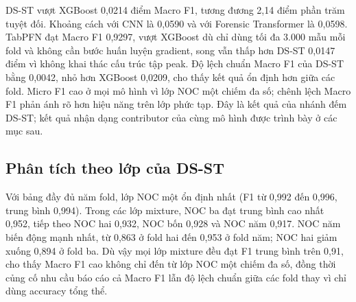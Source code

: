 \documentclass[12pt,a4paper]{article}
\begin{document}
DS-ST vượt XGBoost 0,0214 điểm Macro F1, tương đương 2,14 điểm phần trăm tuyệt đối. Khoảng cách với CNN là 0,0590 và với Forensic Transformer là 0,0598. TabPFN đạt Macro F1 0,9297, vượt XGBoost dù chỉ dùng tối đa 3.000 mẫu mỗi fold và không cần bước huấn luyện gradient, song vẫn thấp hơn DS-ST 0,0147 điểm vì không khai thác cấu trúc tập peak. Độ lệch chuẩn Macro F1 của DS-ST bằng 0,0042, nhỏ hơn XGBoost 0,0209, cho thấy kết quả ổn định hơn giữa các fold. Micro F1 cao ở mọi mô hình vì lớp NOC một chiếm đa số; chênh lệch Macro F1 phản ánh rõ hơn hiệu năng trên lớp phức tạp. Đây là kết quả của nhánh đếm DS-ST; kết quả nhận dạng contributor của cùng mô hình được trình bày ở các mục sau.

\subsection{Phân tích theo lớp của DS-ST}

\begin{table}[H]
\centering
\caption{F1 theo lớp NOC của DS-ST trên từng fold GroupKFold 5. Tất cả giá trị được trích trực tiếp từ báo cáo phân loại.}
\label{tab:perclass}
\small
{}
\end{table}

Với bảng đầy đủ năm fold, lớp NOC một ổn định nhất (F1 từ 0,992 đến 0,996, trung bình 0,994). Trong các lớp mixture, NOC ba đạt trung bình cao nhất 0,952, tiếp theo NOC hai 0,932, NOC bốn 0,928 và NOC năm 0,917. NOC năm biến động mạnh nhất, từ 0,863 ở fold hai đến 0,953 ở fold năm; NOC hai giảm xuống 0,894 ở fold ba. Dù vậy mọi lớp mixture đều đạt F1 trung bình trên 0,91, cho thấy Macro F1 cao không chỉ đến từ lớp NOC một chiếm đa số, đồng thời củng cố nhu cầu báo cáo cả Macro F1 lẫn độ lệch chuẩn giữa các fold thay vì chỉ dùng accuracy tổng thể.
\end{document}
